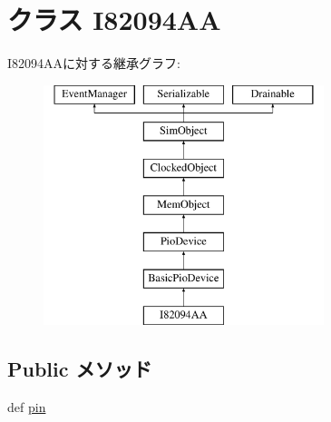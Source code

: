 \hypertarget{classI82094AA_1_1I82094AA}{
\section{クラス I82094AA}
\label{classI82094AA_1_1I82094AA}
}
I82094AAに対する継承グラフ:\begin{figure}[H]
\begin{center}
\leavevmode
\includegraphics[height=7cm]{classI82094AA_1_1I82094AA}
\end{center}
\end{figure}
\subsection*{Public メソッド}
\begin{DoxyCompactItemize}
\item 
def \hyperlink{classI82094AA_1_1I82094AA_a55935323323b227bf5734e0fea2cc88f}{pin}
\end{DoxyCompactItemize}
